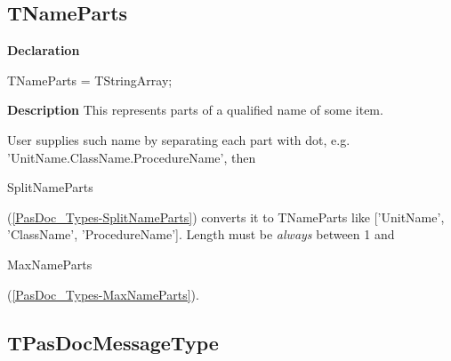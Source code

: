 \documentclass{report}
\newif\ifpdf
\begin{document}
\subsection*{TNameParts}
\fi
\label{PasDoc_Types-TNameParts}
\begin{list}{}{
\setlength{\itemindent}{0cm}
\setlength{\listparindent}{0cm}
\setlength{\leftmargin}{\evensidemargin}
\addtolength{\leftmargin}{\tmplength}
\settowidth{\labelsep}{X}
\addtolength{\leftmargin}{\labelsep}
\setlength{\labelwidth}{\tmplength}
}
\item[\textbf{Declaration}\hfill]
\ifpdf
\begin{flushleft}
\fi
\begin{ttfamily}
TNameParts = TStringArray;\end{ttfamily}

\ifpdf
\end{flushleft}
\fi

\par
\item[\textbf{Description}]
This represents parts of a qualified name of some item.

User supplies such name by separating each part with dot, e.g. 'UnitName.ClassName.ProcedureName', then \begin{ttfamily}SplitNameParts\end{ttfamily}(\ref{PasDoc_Types-SplitNameParts}) converts it to TNameParts like ['UnitName', 'ClassName', 'ProcedureName']. Length must be \textit{always} between 1 and \begin{ttfamily}MaxNameParts\end{ttfamily}(\ref{PasDoc_Types-MaxNameParts}).

\end{list}
\ifpdf
\subsection*{\large{\textbf{TPasDocMessageType}}\normalsize\hspace{1ex}\hrulefill}
\else
\end{document}
